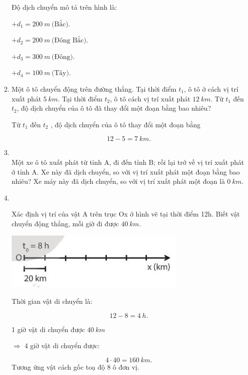 \begin{enumerate}[label=\bfseries Bài \arabic*:,leftmargin=1.5cm]
	\hideall
	{	
		Độ dịch chuyển mô tả trên hình là:
		
		$+ d_1 = \SI{200}{m}\ \text{(Bắc)}.$
		
		$+ d_2 = \SI{200}{m}\ \text{(Đông Bắc)}.$
		
		$+ d_3 = \SI{300}{m}\ \text{(Đông)}.$
		
		$+ d_4 = \SI{100}{m}\ \text{(Tây)}.$
		
		
	}

	\item {}
	
	
	{
		Một ô tô chuyển động trên đường thẳng. Tại thời điểm $t_1$, ô tô ở cách vị trí xuất phát $\SI{5}{km}$. Tại thời điểm $t_2$, ô tô cách vị trí xuất phát $\SI{12}{km}$. Từ $t_1$ đến $t_2$, độ dịch chuyển của ô tô đã thay đổi một đoạn bằng bao nhiêu?
		
	}
	
	\hideall
	{	
		Từ $t_1$ đến $t_2$ ,  độ dịch chuyển của ô tô thay đổi một đoạn bằng 
		
		$$12-5 = \SI{7}{km}.$$
	}
	\item {}\\
	{Một xe ô tô xuất phát từ tỉnh A, đi đến tỉnh B; rồi lại trở về vị trí xuất phát ở tỉnh A. Xe này đã dịch chuyển, so với vị trí xuất phát một đoạn bằng bao nhiêu? 
	}
	\hideall
	{Xe máy này đã dịch chuyển, so với vị trí xuất phát một đoạn là $\SI{0}{km}$.
	}

	\item {}\\
	{Xác định vị trí của vật A trên trục Ox ở hình vẽ tại thời điểm 12h. Biết vật chuyển động thẳng, mỗi giờ đi được $\SI{40}{km}$.
		
		\begin{center}
			\includegraphics[scale=1]{../figs/VN10-2022-PH-TP004-1.jpg}
		\end{center}
	}
	\hideall
	{	Thời gian vật di chuyển là:
		
		$$12 - 8 = \SI{4}{h}.$$
		
		1 giờ vật di chuyển được $\SI{40}{km}$
		
		$\Rightarrow$ 4 giờ vật di chuyển được: 
		
		$$4 \cdot 40 = \SI{160}{km}.$$
		Tương ứng vật cách gốc toạ độ 8 ô đơn vị.
	}
	

\end{enumerate}
